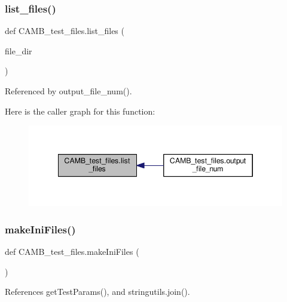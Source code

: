 \subsubsection{\texorpdfstring{list\+\_\+files()}{list\_files()}}
{\footnotesize\ttfamily def C\+A\+M\+B\+\_\+test\+\_\+files.\+list\+\_\+files (\begin{DoxyParamCaption}\item[{}]{file\+\_\+dir }\end{DoxyParamCaption})}



Referenced by output\+\_\+file\+\_\+num().

Here is the caller graph for this function\+:
\nopagebreak
\begin{figure}[H]
\begin{center}
\leavevmode
\includegraphics[width=346pt]{namespaceCAMB__test__files_ad8e40066d0c7e67c40c354153d790106_icgraph}
\end{center}
\end{figure}
\mbox{\label{namespaceCAMB__test__files_a2071b2434992a52dd7fc9c49db14d86d}} 
\subsubsection{\texorpdfstring{make\+Ini\+Files()}{makeIniFiles()}}
{\footnotesize\ttfamily def C\+A\+M\+B\+\_\+test\+\_\+files.\+make\+Ini\+Files (\begin{DoxyParamCaption}{ }\end{DoxyParamCaption})}



References get\+Test\+Params(), and stringutils.\+join().

